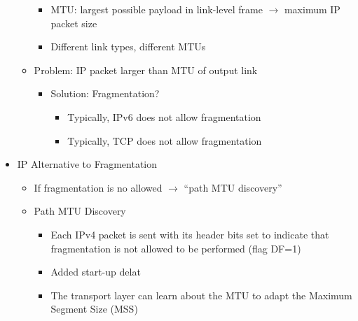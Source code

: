 \begin{itemize}
\begin{itemize}
        \begin{itemize}

          \item MTU: largest possible payload in link-level frame $\to$ maximum IP packet size

          \item Different link types, different MTUs

        \end{itemize}

      \item Problem: IP packet larger than MTU of output link

        \begin{itemize}

          \item Solution: Fragmentation?

            \begin{itemize}

              \item Typically, IPv6 does not allow fragmentation

              \item Typically, TCP does not allow fragmentation

            \end{itemize}

        \end{itemize}

    \end{itemize}

  \item IP Alternative to Fragmentation

    \begin{itemize}

      \item If fragmentation is no allowed $\to$ ``path MTU discovery''

      \item Path MTU Discovery

        \begin{itemize}

          \item Each IPv4 packet is sent with its header bits set to indicate that fragmentation is not allowed to be performed (flag DF=1)

          \item Added start-up delat

          \item The transport layer can learn about the MTU to adapt the Maximum Segment Size (MSS)


\end{itemize}
\end{itemize}
\end{itemize}
